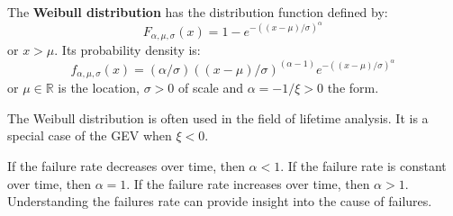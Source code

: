 \begin{f}


The \textbf{Weibull distribution} has the distribution function defined by:
\[
F_{\alpha,\mu, \sigma}(x) = 1- e^{-((x-\mu)/\sigma)^\alpha}\,
\]
or \(x >\mu\).
Its probability density is:
\[
f_{\alpha,\mu,\sigma}(x) = (\alpha/\sigma) ((x-\mu)/\sigma)^{(\alpha-1)} e^{-((x-\mu)/\sigma)^\alpha}\,
\]
or  \(\mu\in\mathbb{R}\) is the location, \(\sigma>0\) of scale and  \(\alpha=-1/\xi>0 \) the form.

The Weibull distribution is often used in the field of lifetime analysis. It is a special case of the GEV when \(\xi<0\).

If the failure rate decreases over time, then \(\alpha<1\). If the failure rate is constant over time, then \(\alpha=1\). If the failure rate increases over time, then \(\alpha>1\). Understanding the failures rate can provide insight into the cause of failures.


\begin{center}

\end{center}
\end{f}


